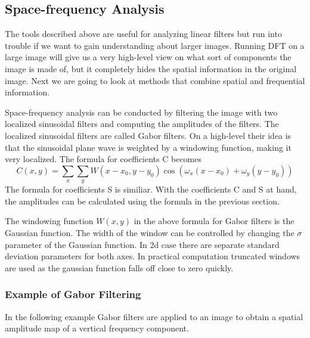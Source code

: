 \documentclass[]{article}
\begin{document}
\subsection{Space-frequency Analysis}
\label{space-frequency-analysis}
The tools described above are useful for analyzing linear filters but run into
trouble if we want to gain understanding about larger images. Running DFT on a
large image will give us a very high-level view on what sort of components the
image is made of, but it completely hides the spatial information in the
original image. Next we are going to look at methods that combine spatial and
frequential information.

Space-frequency analysis can be conducted by filtering the image with two
localized sinusoidal filters and computing the amplitudes of the filters. The
localized sinusoidal filters are called Gabor filters. On a high-level their
idea is that the sinusoidal plane wave is weighted by a windowing function,
making it very localized. The formula for coefficients C becomes
\begin{equation}
  C(x,y) = \sum_{x}{\sum_{y}{W(x-x_{0}, y-y_{0}) \cos(\omega_{x} (x - x_{0}) + \omega_{y} (y - y_{0})) }}
\end{equation}
The formula for coefficients S is similiar. With the coefficients C and S at
hand, the amplitudes can be calculated using the formula in the previous
section.

The windowing function $W(x,y)$ in the above formula for Gabor filters is the
Gaussian function. The width of the window can be controlled by changing the
$\sigma$ parameter of the Gaussian function. In 2d case there are separate
standard deviation parameters for both axes. In practical computation truncated
windows are used as the gaussian function falls off close to zero quickly.

\subsubsection{Example of Gabor Filtering}
\label{example-of-gabor-filtering}
In the following example Gabor filters are applied to an image to obtain a
spatial amplitude map of a vertical frequency component.
\end{document}
